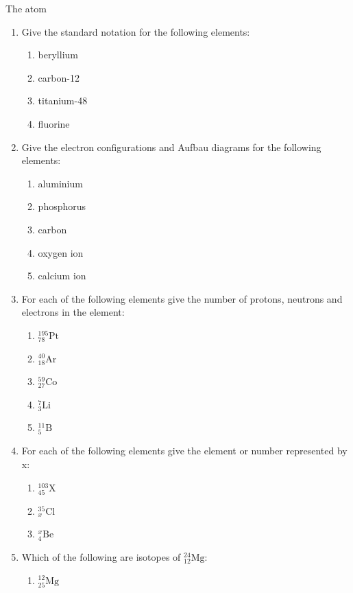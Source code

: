\begin{eocexercises}{The atom}
\begin{enumerate}[noitemsep, label=\textbf{\arabic*}. ]
        \item Give the standard notation for the following elements:
\label{m38741*id8223}\begin{enumerate}[noitemsep, label=\textbf{\alph*}. ] 
            \item beryllium
\item carbon-12
\item titanium-48
\item fluorine
\end{enumerate}
\item Give the electron configurations and Aufbau diagrams for the following elements:\label{m38741*id7624}\begin{enumerate}[noitemsep, label=\textbf{\alph*}. ] 
            \item aluminium
\item phosphorus
\item carbon
\item oxygen ion
\item calcium ion
\end{enumerate}
\item For each of the following elements give the number of protons, neutrons and electrons in the element: \label{m38741*id74374}\begin{enumerate}[noitemsep, label=\textbf{\alph*}. ] 
            \item $_{78}^{195}\text{Pt}$
\item $_{18}^{40}\text{Ar}$
\item $_{27}^{59}\text{Co}$
\item $_{3}^{7}\text{Li}$
\item $_{5}^{11}\text{B}$
\end{enumerate}
\item For each of the following elements give the element or number represented by x: \label{m38741*id7434324}\begin{enumerate}[noitemsep, label=\textbf{\alph*}. ] 
            \item $_{45}^{103}\text{X}$
\item $_{x}^{35}\text{Cl}$
\item $_{4}^{x}\text{Be}$
\end{enumerate}
\item Which of the following are isotopes of $_{12}^{24}\text{Mg}$: \label{m38741*id743234}
\begin{enumerate}[noitemsep, label=\textbf{\alph*}. ] 
            \item $_{25}^{12}\text{Mg}$

\end{enumerate}
\end{enumerate}
\end{eocexercises}
